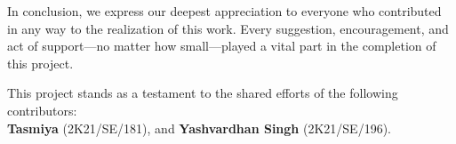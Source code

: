 \begin{doublespace}
  \vspace{1em}
  \noindent
  In conclusion, we express our deepest appreciation to everyone who contributed in any way
  to the realization of this work. Every suggestion, encouragement, and act of support—no
  matter how small—played a vital part in the completion of this project.

  \vspace{1em}
  \noindent
  This project stands as a testament to the shared efforts of the following contributors:\\
  \textbf{Tasmiya} (2K21/SE/181), and \textbf{Yashvardhan Singh} (2K21/SE/196).
\end{doublespace}

\newpage
